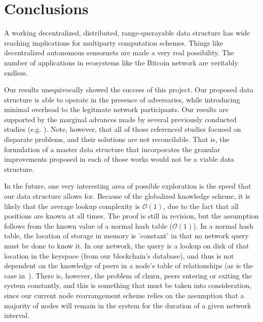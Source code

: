 \documentclass[10pt]{IEEEtran}
\begin{document}
\section{Conclusions}
\par A working decentralized, distributed, range-querayable data structure has wide reaching implications for multiparty computation schemes. Things like decentralized autonomous sensornets are made a very real possibility. The number of applications in ecosystems like the Bitcoin network are veritably endless.

\par Our results unequivocally showed the success of this project. Our proposed data structure is able to operate in the presence of adversaries, while introducing minimal overhead to the legitmate network participants. Our results are supported by the marginal advances made by several previously conducted studies (e.g. \cite{forestiero2009self,Freitas:2013tb,LesniewskiLass:2010ue}). Note, however, that all of those referenced studies focused on disparate problems, and their solutions are not reconcilable. That is, the formulation of a master data structure that incorporates the granular improvements proposed in each of those works would not be a viable data structure.

\par In the future, one very interesting area of possible exploration is the speed that our data structure allows for. Because of the globalized knowledge scheme, it is likely that the average lookup complexity is $\mathcal{O}(1)$, due to the fact that all positions are known at all times. The proof is still in revision, but the assumption follows from the known value of a normal hash table ($\mathcal{O}(1)$). In a normal hash table, the location of storage in memory is 'constant' in that no network query must be done to know it. In our network, the query is a lookup on disk of that location in the keyspace (from our blockchain's database), and thus is not dependent on the knowledge of peers in a node's table of relationships (as is the case in~\cite{Stoica:2001dj}). There is, however, the problem of churn, peers entering or exiting the system constantly, and this is something that must be taken into consideration, since our current node rearrangement scheme relies on the assumption that a majority of nodes will remain in the system for the duration of a given network interval. 




\printbibliography
\end{document}
